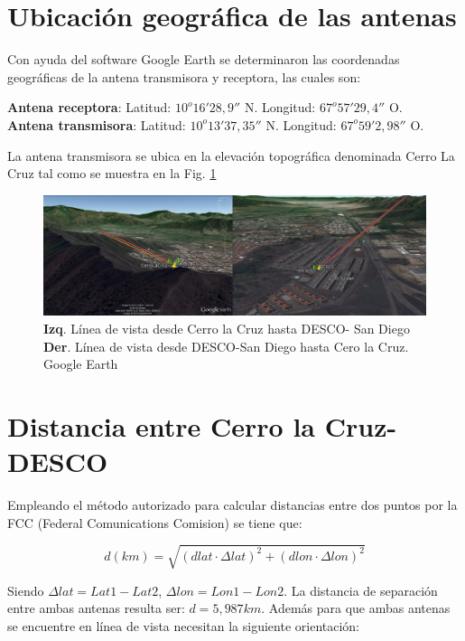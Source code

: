 \documentclass[11pt, a4paper, twosides]{report}
\begin{document}
\section{Ubicación geográfica de las antenas}
Con ayuda del software Google Earth se determinaron las coordenadas geográficas de
la antena transmisora y receptora, las cuales son:

\noindent \textbf{Antena receptora}: Latitud: $10^{o}16'28,9''$ N. Longitud: $67^{o}57'29,4''$ O.\\
\noindent \textbf{Antena transmisora}: Latitud: $10^{o}13'37,35''$ N. Longitud: $67^{o}59'2,98''$ O.

La antena transmisora se ubica en la elevación topográfica denominada Cerro La Cruz tal como se muestra en la Fig. \ref{fig:ubiq}
\begin{figure}[h]
    \centering
    \includegraphics[width=1\linewidth]{ubiq.png}
    \caption{\textbf{Izq}. Línea de vista desde Cerro la Cruz hasta DESCO- San               Diego\\
            \textbf{Der}. Línea de vista desde  DESCO-San Diego hasta Cero la Cruz. Google Earth}
    \label{fig:ubiq}
\end{figure}

\section{Distancia entre Cerro la Cruz-DESCO }
\label{chap:radio}
Empleando el método autorizado para calcular distancias entre dos puntos por la FCC (Federal Comunications Comision) se tiene que:

\begin{equation}
    d(km) = \sqrt{(dlat \cdot \Delta lat)^{2} + (dlon \cdot \Delta lon)^{2}}
\end{equation}

Siendo $\Delta lat = Lat1 - Lat2$, $\Delta lon = Lon1 - Lon2$. La distancia de separación entre ambas antenas resulta ser: \textbf{$d = 5,987 km$}. Además para que ambas antenas se encuentre en línea de vista necesitan la siguiente orientación: 
\end{document}
